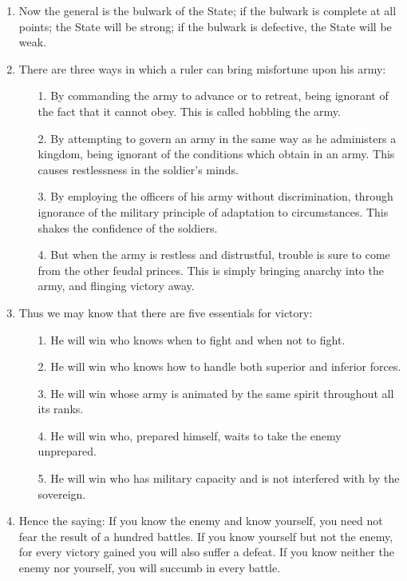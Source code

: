 \documentclass[oneside]{book}
\begin{document}
\begin{enumerate}
	\item Now the general is the bulwark of the State; if the bulwark is complete at all points; the State will be strong; if the bulwark is defective, the State will be weak.
	\item There are three ways in which a ruler can bring misfortune upon his army:
	\begin{enumerate}
	        \item[1.] By commanding the army to advance or to retreat, being ignorant of the fact that it cannot obey. This is called hobbling the army.
	        \item[2.] By attempting to govern an army in the same way as he administers a kingdom, being ignorant of the conditions which obtain in an army. This causes restlessness in the soldier's minds.
	        \item[3.] By employing the officers of his army without discrimination, through ignorance of the military principle of adaptation to circumstances. This shakes the confidence of the soldiers.
	        \item[4.] But when the army is restless and distrustful, trouble is sure to come from the other feudal princes. This is simply bringing anarchy into the army, and flinging victory away.
	\end{enumerate}
	\item Thus we may know that there are five essentials for victory:
	\begin{enumerate}
		\item[1.] He will win who knows when to fight and when not to fight.
		\item[2.] He will win who knows how to handle both superior and inferior forces.
		\item[3.] He will win whose army is animated by the same spirit throughout all its ranks.
		\item[4.] He will win who, prepared himself, waits to take the enemy unprepared.
		\item[5.] He will win who has military capacity and is not interfered with by the sovereign.
	\end{enumerate}
	\item Hence the saying: If you know the enemy and know yourself, you need not fear the result of a hundred battles. If you know yourself but not the enemy, for every victory gained you will also suffer a defeat. If you know neither the enemy nor yourself, you will succumb in every battle.
\end{enumerate}
\end{document}
